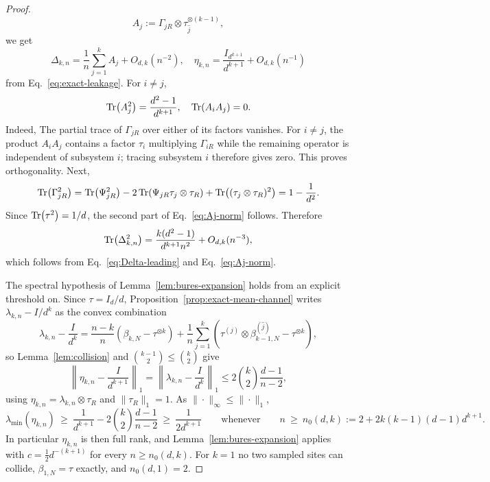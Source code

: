 \documentclass[10pt,twocolumn,superscriptaddress,aps,amsmath,amssymb,citeautoscript,floatfix,prx]{revtex4-2}
\theoremstyle{plain}
\theoremstyle{plain}
\theoremstyle{plain}
\theoremstyle{plain}
\theoremstyle{plain}
\theoremstyle{plain}
\theoremstyle{plain}
\theoremstyle{definition}
\theoremstyle{plain}
\begin{document}
\begin{appendix}
\begin{proof}
\begin{equation}
\label{eq:Aj}
  A_j:=\Gamma_{jR}\otimes\tau_{\widehat j}^{\otimes(k-1)},
\end{equation}
we get
 \begin{equation}
\label{eq:Delta-leading}
  \Delta_{k,n}=\frac1n\sum_{j=1}^kA_j+O_{d,k}(n^{-2}), \quad \eta_{k,n}=\frac{I_{d^{k+1}}}{d^{k+1}}+O_{d,k}(n^{-1})
\end{equation}
from Eq.~\eqref{eq:exact-leakage}.
For $i\ne j$,
\begin{equation}
\label{eq:Aj-norm}
  \Tr(A_j^2)=\frac{d^2-1}{d^{k+1}}, \quad \Tr(A_iA_j)=0.
\end{equation}
Indeed, The partial trace of $\Gamma_{jR}$ over either of its factors vanishes. 
For $i\ne j$, the product $A_iA_j$ contains a factor $\tau_i$ multiplying $\Gamma_{iR}$ while the remaining operator is independent of subsystem $i$; 
tracing subsystem $i$ therefore gives zero. This proves orthogonality.
Next,
\[
  \Tr(\Gamma_{jR}^2)
  =\Tr(\Psi_{jR}^2)
   -2\Tr(\Psi_{jR}\tau_j\otimes\tau_R)
   +\Tr((\tau_j\otimes\tau_R)^2)
  =1-\frac1{d^2}.
\]
Since $\Tr(\tau^2)=1/d$, the second part of Eq.~\eqref{eq:Aj-norm} follows. Therefore
\begin{equation}
\label{eq:Delta-HS}
  \Tr(\Delta_{k,n}^2)
  =\frac{k(d^2-1)}{d^{k+1}n^2}+O_{d,k}(n^{-3}),
\end{equation}
which follows from Eq.~\eqref{eq:Delta-leading} and Eq.~\eqref{eq:Aj-norm}.

The spectral hypothesis of Lemma~\ref{lem:bures-expansion} holds from an explicit threshold on. Since $\tau=I_d/d$, 
Proposition~\ref{prop:exact-mean-channel} writes $\lambda_{k,n}-I/d^k$ as the convex combination
\[
  \lambda_{k,n}-\frac{I}{d^k}
  =\frac{n-k}{n}\left(\beta_{k,N}-\tau^{\otimes k}\right)
   +\frac1n\sum_{j=1}^k\left(\tau^{(j)}\otimes\beta_{k-1,N}^{(\widehat j)}-\tau^{\otimes k}\right),
\]
so Lemma~\ref{lem:collision} and $\binom{k-1}2\le\binom k2$ give
\[
  \left\|\eta_{k,n}-\frac{I}{d^{k+1}}\right\|_1
  =\left\|\lambda_{k,n}-\frac{I}{d^k}\right\|_1
  \le 2\binom k2\frac{d-1}{n-2},
\]
using $\eta_{k,n}=\lambda_{k,n}\otimes\tau_R$ and $\|\tau_R\|_1=1$. As $\|\cdot\|_\infty\le\|\cdot\|_1$,
\[
  \lambda_{\min}(\eta_{k,n})
  \ \ge\ \frac{1}{d^{k+1}}-2\binom k2\frac{d-1}{n-2}
  \ \ge\ \frac{1}{2d^{k+1}}
  \qquad\text{whenever}\qquad
  n\ \ge\ n_0(d,k):=2+2k(k-1)(d-1)d^{k+1}.
\]
In particular $\eta_{k,n}$ is then full rank, and Lemma~\ref{lem:bures-expansion} applies with $c=\tfrac12 d^{-(k+1)}$ for every $n\ge n_0(d,k)$. For $k=1$ no two sampled sites can collide, $\beta_{1,N}=\tau$ exactly, and $n_0(d,1)=2$.


\end{proof}
\end{appendix}
\end{document}
